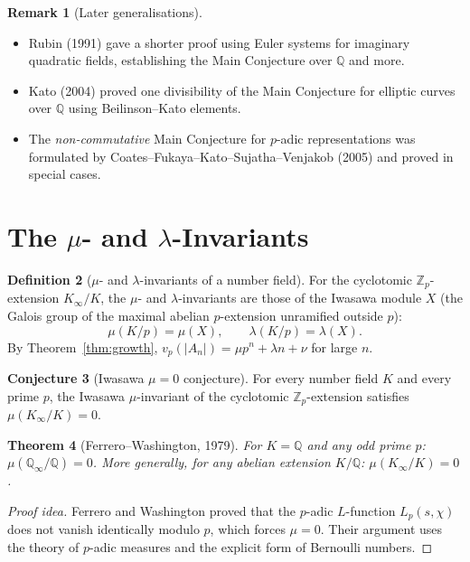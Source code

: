 \documentclass[12pt,a4paper]{amsart}
\newtheorem{theorem}{Theorem}[section]
\theoremstyle{definition}
\newtheorem{definition}[theorem]{Definition}
\newtheorem{remark}[theorem]{Remark}
\newtheorem{conjecture}[theorem]{Conjecture}
\newcommand{\Q}{\mathbb{Q}}
\newcommand{\Zp}{\mathbb{Z}_p}
\begin{document}
\begin{remark}[Later generalisations]
\begin{itemize}
  \item Rubin (1991) gave a shorter proof using Euler systems for imaginary
    quadratic fields, establishing the Main Conjecture over $\Q$ and more.
  \item Kato (2004) proved one divisibility of the Main Conjecture for
    elliptic curves over $\Q$ using Beilinson--Kato elements.
  \item The \emph{non-commutative} Main Conjecture for $p$-adic representations
    was formulated by Coates--Fukaya--Kato--Sujatha--Venjakob (2005) and
    proved in special cases.
\end{itemize}
\end{remark}

\section{The $\mu$- and $\lambda$-Invariants}

\begin{definition}[$\mu$- and $\lambda$-invariants of a number field]
\label{def:mu_lambda}
For the cyclotomic $\Zp$-extension $K_\infty/K$, the $\mu$- and
$\lambda$-invariants are those of the Iwasawa module $X$ (the Galois group
of the maximal abelian $p$-extension unramified outside $p$):
\[
  \mu(K/p) = \mu(X), \qquad \lambda(K/p) = \lambda(X).
\]
By Theorem~\ref{thm:growth}, $v_p(|A_n|) = \mu p^n + \lambda n + \nu$
for large $n$.
\end{definition}

\begin{conjecture}[Iwasawa $\mu = 0$ conjecture]
For every number field $K$ and every prime $p$, the Iwasawa $\mu$-invariant
of the cyclotomic $\Zp$-extension satisfies $\mu(K_\infty/K) = 0$.
\end{conjecture}

\begin{theorem}[Ferrero--Washington, 1979]
For $K = \Q$ and any odd prime $p$: $\mu(\Q_\infty/\Q) = 0$.
More generally, for any abelian extension $K/\Q$: $\mu(K_\infty/K) = 0$.
\end{theorem}

\begin{proof}[Proof idea]
Ferrero and Washington proved that the $p$-adic $L$-function $L_p(s, \chi)$
does not vanish identically modulo $p$, which forces $\mu = 0$.
Their argument uses the theory of $p$-adic measures and the explicit
form of Bernoulli numbers.
\end{proof}
\end{document}
